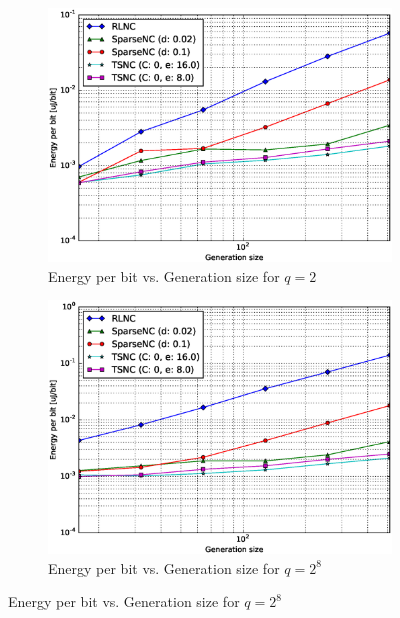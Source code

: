 \begin{figure}
    \centering
    \begin{subfigure}[b]{0.475\textwidth}
        \centering
        \includegraphics[width=1.1\textwidth]{images/06_06_2016/energy_per_bit_vs_generation_size_Rasp_Binary_encoder_1600.eps}
        \caption[]%
        {{\small Energy per bit vs. Generation size for $q = 2$}}
        \label{fig:enc_ene_rasp1_gen_gf2}
    \end{subfigure}
    \hfill
    \begin{subfigure}[b]{0.475\textwidth}
        \centering
        \includegraphics[width=1.1\textwidth]{images/06_06_2016/energy_per_bit_vs_generation_size_Rasp_Binary8_encoder_1600.eps}
        \caption[]%
        {{\small Energy per bit vs. Generation size for $q = 2^8$}}

\end{subfigure}
\end{figure}
